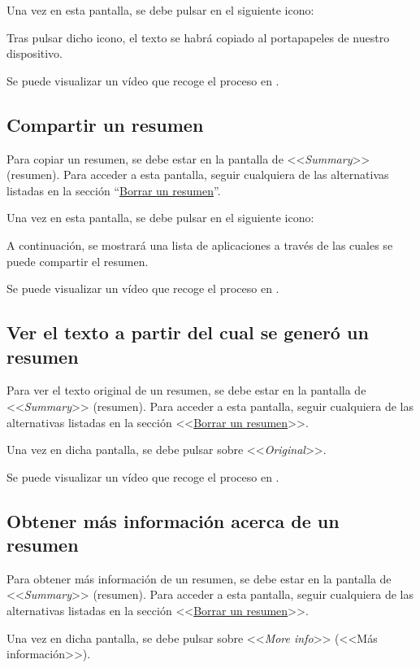 Una vez en esta pantalla, se debe pulsar en el siguiente icono:

Tras pulsar dicho icono, el texto se habrá copiado al portapapeles de nuestro dispositivo.

Se puede visualizar un vídeo que recoge el proceso en \href{}{}.

\subsection{Compartir un resumen}

Para copiar un resumen, se debe estar en la pantalla de <<\emph{Summary}>> (resumen). Para acceder a esta pantalla, seguir cualquiera de las alternativas listadas en la sección ``\hyperref[subsection:borrar]{Borrar un resumen}''.

Una vez en esta pantalla, se debe pulsar en el siguiente icono:

A continuación, se mostrará una lista de aplicaciones a través de las cuales se puede compartir el resumen.

Se puede visualizar un vídeo que recoge el proceso en \href{}{}.

\subsection{Ver el texto a partir del cual se generó un resumen}

Para ver el texto original de un resumen, se debe estar en la pantalla de <<\emph{Summary}>> (resumen). Para acceder a esta pantalla, seguir cualquiera de las alternativas listadas en la sección <<\hyperref[subsection:borrar]{Borrar un resumen}>>.

Una vez en dicha pantalla, se debe pulsar sobre <<\emph{Original}>>.

Se puede visualizar un vídeo que recoge el proceso en \href{}{}.

\subsection{Obtener más información acerca de un resumen}

Para obtener más información de un resumen, se debe estar en la pantalla de <<\emph{Summary}>> (resumen). Para acceder a esta pantalla, seguir cualquiera de las alternativas listadas en la sección <<\hyperref[subsection:borrar]{Borrar un resumen}>>.

Una vez en dicha pantalla, se debe pulsar sobre <<\emph{More info}>> (<<Más información>>).

